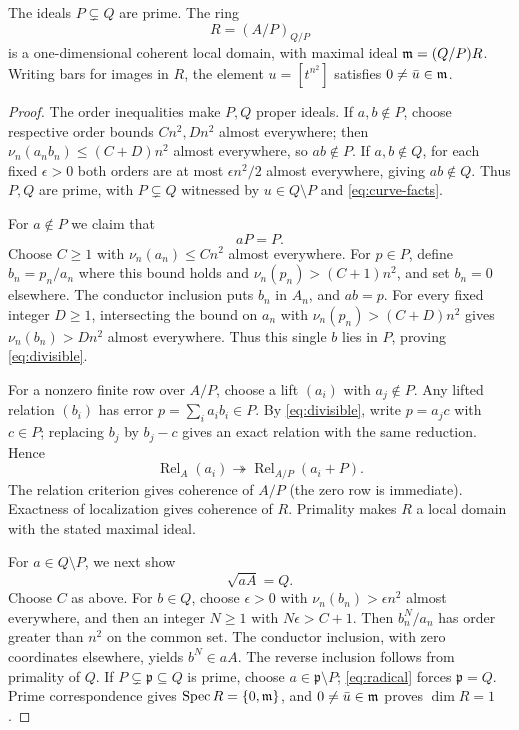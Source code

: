 \begin{proposition}\label{prop:ring}
The ideals $P\subsetneq Q$ are prime. The ring
\[
 R=(A/P)_{Q/P}
\]
is a one-dimensional coherent local domain, with maximal ideal
$\mathfrak m=(Q/P)R$. Writing bars for images in $R$, the element
$u=[t^{n^2}]$ satisfies $0\ne\bar u\in\mathfrak m$.
\end{proposition}
\begin{proof}
The order inequalities make $P,Q$ proper ideals. If $a,b\notin P$,
choose respective order bounds $Cn^2,Dn^2$ almost everywhere;
then $\nu_n(a_nb_n)\leq(C+D)n^2$ almost everywhere, so $ab\notin P$.
If $a,b\notin Q$, for each fixed $\epsilon>0$ both orders are at most
$\epsilon n^2/2$ almost everywhere, giving $ab\notin Q$.
Thus $P,Q$ are prime, with $P\subsetneq Q$ witnessed by
$u\in Q\setminus P$ and \eqref{eq:curve-facts}.

For $a\notin P$ we claim that
\begin{equation}\label{eq:divisible}
 aP=P.
\end{equation}
Choose $C\geq1$ with $\nu_n(a_n)\leq Cn^2$ almost everywhere.
For $p\in P$, define $b_n=p_n/a_n$ where this bound holds and
$\nu_n(p_n)>(C+1)n^2$, and set $b_n=0$ elsewhere.
The conductor inclusion puts $b_n$ in $A_n$, and $ab=p$.
For every fixed integer $D\geq1$, intersecting the bound on $a_n$
with $\nu_n(p_n)>(C+D)n^2$ gives $\nu_n(b_n)>Dn^2$ almost everywhere.
Thus this single $b$ lies in $P$, proving \eqref{eq:divisible}.

For a nonzero finite row over $A/P$, choose a lift $(a_i)$ with
$a_j\notin P$. Any lifted relation $(b_i)$ has error
$p=\sum_i a_i b_i\in P$. By \eqref{eq:divisible}, write $p=a_jc$
with $c\in P$; replacing $b_j$ by $b_j-c$ gives an exact relation
with the same reduction. Hence
\[
 \operatorname{Rel}_A(a_i)\twoheadrightarrow
 \operatorname{Rel}_{A/P}(a_i+P).
\]
The relation criterion gives coherence of $A/P$ (the zero row is
immediate). Exactness of localization gives coherence of $R$.
Primality makes $R$ a local domain with the stated maximal ideal.

For $a\in Q\setminus P$, we next show
\begin{equation}\label{eq:radical}
 \sqrt{aA}=Q.
\end{equation}
Choose $C$ as above. For $b\in Q$, choose $\epsilon>0$ with
$\nu_n(b_n)>\epsilon n^2$ almost everywhere, and then an integer
$N\geq1$ with $N\epsilon>C+1$.
Then $b_n^N/a_n$ has order greater than $n^2$ on the common set.
The conductor inclusion, with zero coordinates elsewhere, yields
$b^N\in aA$. The reverse inclusion follows from primality of $Q$.
If $P\subsetneq\mathfrak p\subseteq Q$ is prime, choose
$a\in\mathfrak p\setminus P$; \eqref{eq:radical} forces
$\mathfrak p=Q$. Prime correspondence gives
$\operatorname{Spec} R=\{0,\mathfrak m\}$, and $0\ne\bar u\in\mathfrak m$ proves $\dim R=1$.
\end{proof}

